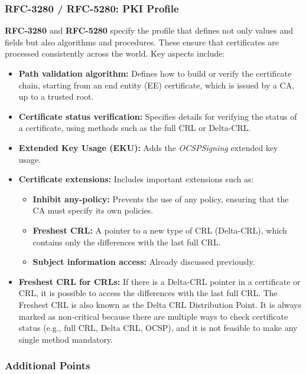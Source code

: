 \subsubsection{RFC-3280 / RFC-5280: PKI Profile}

\textbf{RFC-3280} and \textbf{RFC-5280} specify the profile that defines 
not only values and fields but also algorithms and procedures. These 
ensure that certificates are processed consistently across the world. 
Key aspects include:

\begin{itemize}
  \item \textbf{Path validation algorithm:} Defines how to build or 
    verify the certificate chain, starting from an end entity (EE) 
    certificate, which is issued by a CA, up to a trusted root.
  \item \textbf{Certificate status verification:} Specifies details 
    for verifying the status of a certificate, using methods such as 
    the full CRL or Delta-CRL.
  \item \textbf{Extended Key Usage (EKU):} Adds the \emph{OCSPSigning} 
    extended key usage.
  \item \textbf{Certificate extensions:} Includes important extensions 
    such as:
  \begin{itemize}
    \item \textbf{Inhibit any-policy:} Prevents the use of any policy, 
      ensuring that the CA must specify its own policies.
    \item \textbf{Freshest CRL:} A pointer to a new type of CRL 
      (Delta-CRL), which contains only the differences with the last 
      full CRL.
    \item \textbf{Subject information access:} Already discussed 
      previously.
  \end{itemize}
  \item \textbf{Freshest CRL for CRLs:} If there is a Delta-CRL 
    pointer in a certificate or CRL, it is possible to access the 
    differences with the last full CRL. The Freshest CRL is also known 
    as the Delta CRL Distribution Point. It is always marked as 
    non-critical because there are multiple ways to check certificate 
    status (e.g., full CRL, Delta CRL, OCSP), and it is not feasible 
    to make any single method mandatory.
\end{itemize}

\subsubsection{Additional Points}

